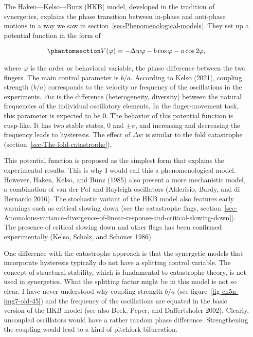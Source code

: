 \documentclass[
  a4paper,
  DIV=11,
  numbers=noendperiod,
  oneside]{scrreprt}
\begin{document}
The Haken---Kelso---Bunz (HKB) model, developed in the tradition of
synergetics, explains the phase transition between in-phase and
anti-phase motions in a way we saw in
section~\ref{sec-Phenomenological-models}. They set up a potential
function in the form of

\begin{equation}\phantomsection\label{eq-ch5n-4-old-20}{
V(\varphi) = - \Delta w\varphi - b\cos\varphi - a\cos{2\varphi},}\end{equation}

where \(\varphi\) is the order or behavioral variable, the phase
difference between the two fingers. The main control parameter is
\(b/a\). According to Kelso (2021), coupling strength (\(b/a\))
corresponds to the velocity or frequency of the oscillations in the
experiments. \(\Delta w\) is the difference (heterogeneity, diversity)
between the natural frequencies of the individual oscillatory elements.
In the finger-movement task, this parameter is expected to be 0. The
behavior of this potential function is cusp-like. It has two stable
states, 0 and \(\pm \pi\), and increasing and decreasing the frequency
leads to hysteresis. The effect of \(\Delta w\) is similar to the fold
catastrophe (section~\ref{sec-The-fold-catastrophe}).

This potential function is proposed as the simplest form that explains
the experimental results. This is why I would call this a
phenomenological model. However, Haken, Kelso, and Bunz (1985) also
present a more mechanistic model, a combination of van der Pol and
Rayleigh oscillators (Alderisio, Bardy, and di Bernardo 2016). The
stochastic variant of the HKB model also features early warnings such as
critical slowing down (see the catastrophe flags,
section~\ref{sec-Anomalous-variance-divergence-of-linear-response-and-critical-slowing-down}).
The presence of critical slowing down and other flags has been confirmed
experimentally (Kelso, Scholz, and Schöner 1986).

One difference with the catastrophe approach is that the synergetic
models that incorporate hysteresis typically do not have a splitting
control variable. The concept of structural stability, which is
fundamental to catastrophe theory, is not used in synergetics. What the
splitting factor might be in this model is not so clear. I have never
understood why coupling strength \(b/a\) (see
figure~\ref{fig-ch5n-img7-old-45}) and the frequency of the oscillations
are equated in the basic version of the HKB model (see also Beek, Peper,
and Daffertshofer 2002). Clearly, uncoupled oscillators would have a
rather random phase difference. Strengthening the coupling would lead to
a kind of pitchfork bifurcation.
\end{document}
